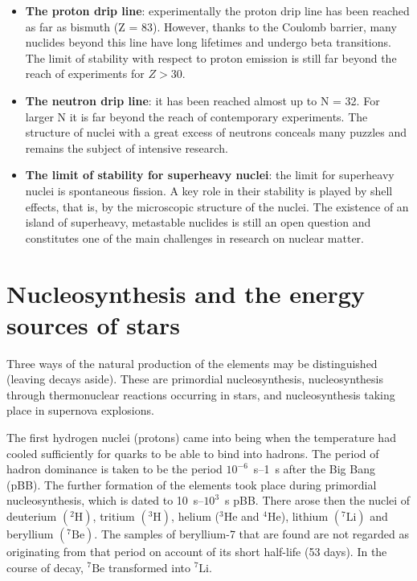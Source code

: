 \begin{itemize}
    \item \textbf{The proton drip line}: experimentally the proton drip line has been reached as far as bismuth (Z = 83). However, thanks to the Coulomb barrier, many nuclides beyond this line have long lifetimes and undergo beta transitions. The limit of stability with respect to proton emission is still far beyond the reach of experiments for $Z > 30$.\merr
    \item \textbf{The neutron drip line}: it has been reached almost up to N = 32. For larger N it is far beyond the reach of contemporary experiments. The structure of nuclei with a great excess of neutrons conceals many puzzles and remains the subject of intensive research.
    \item \textbf{The limit of stability for superheavy nuclei}: the limit for superheavy nuclei is spontaneous fission. A key role in their stability is played by shell effects, that is, by the microscopic structure of the nuclei. The existence of an island of superheavy, metastable nuclides is still an open question and constitutes one of the main challenges in research on nuclear matter.
\end{itemize}

\section{Nucleosynthesis and the energy sources of stars}

Three ways of the natural production of the elements may be distinguished (leaving decays aside). These are primordial nucleosynthesis, nucleosynthesis through thermonuclear reactions occurring in stars, and nucleosynthesis taking place in supernova explosions.

The first hydrogen nuclei (protons) came into being when the temperature had cooled sufficiently for quarks to be able to bind into hadrons. The period of hadron dominance is taken to be the period $10^{-6}$~s--1~s after the Big Bang (pBB). The further formation of the elements took place during primordial nucleosynthesis, which is dated to 10~s--$10^{3}$~s pBB. There arose then the nuclei of deuterium $(^{2}\mathrm{H})$, tritium $(^{3}\mathrm{H})$, helium ($^{3}\mathrm{He}$ and $^{4}\mathrm{He}$), lithium $(^{7}\mathrm{Li})$ and beryllium $(^{7}\mathrm{Be})$. The samples of beryllium-7 that are found are not regarded as originating from that period on account of its short half-life (53 days). In the course of decay, $^{7}\mathrm{Be}$ transformed into $^{7}\mathrm{Li}$.

